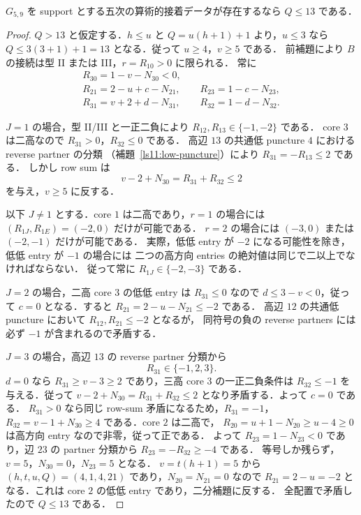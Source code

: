 \begin{proposition}[全ての標準配置における葉分母の上界]
\label{dl19:leaf-bound}
$G_{5,9}$ を support とする五次の算術的接着データが存在するなら $Q\le13$ である．
\end{proposition}
\begin{proof}
$Q>13$ と仮定する．$h\le u$ と $Q=u(h+1)+1$ より，$u\le3$ なら $Q\le3(3+1)+1=13$ となる．従って $u\ge4$，$v\ge5$ である．
前補題により $B$ の接続は型 II または III，$r=R_{10}>0$ に限られる．
常に
\[
 \begin{gathered}
 R_{30}=1-v-N_{30}<0,\\
 R_{21}=2-u+c-N_{21},\qquad R_{23}=1-c-N_{23},\\
 R_{31}=v+2+d-N_{31},\qquad R_{32}=1-d-N_{32}.
 \end{gathered}
\]

$J=1$ の場合，型 II/III と一正二負により $R_{12},R_{13}\in\{-1,-2\}$ である．
core $3$ は二高なので $R_{31}>0$，$R_{32}\le0$ である．
高辺 $13$ の共通低 puncture $4$ における reverse partner の分類
（補題~\ref{ls11:low-puncture}）により $R_{31}=-R_{13}\le2$ である．
しかし row sum は
\[
 v-2+N_{30}=R_{31}+R_{32}\le2
\]
を与え，$v\ge5$ に反する．

以下 $J\ne1$ とする．core $1$ は二高であり，$r=1$ の場合には
$(R_{1J},R_{1E})=(-2,0)$ だけが可能である．
$r=2$ の場合には $(-3,0)$ または $(-2,-1)$ だけが可能である．
実際，低低 entry が $-2$ になる可能性を除き，低低 entry が $-1$ の場合には
二つの高方向 entries の絶対値は同じで二以上でなければならない．
従って常に $R_{1J}\in\{-2,-3\}$ である．

$J=2$ の場合，二高 core $3$ の低低 entry は $R_{31}\le0$ なので
$d\le3-v<0$，従って $c=0$ となる．すると $R_{21}=2-u-N_{21}\le-2$ である．
高辺 $12$ の共通低 puncture において $R_{12},R_{21}\le-2$ となるが，
同符号の負の reverse partners には必ず $-1$ が含まれるので矛盾する．

$J=3$ の場合，高辺 $13$ の reverse partner 分類から
\[
 R_{31}\in\{-1,2,3\}.
\]
$d=0$ なら $R_{31}\ge v-3\ge2$ であり，三高 core $3$ の一正二負条件は
$R_{32}\le-1$ を与える．従って
$v-2+N_{30}=R_{31}+R_{32}\le2$ となり矛盾する．よって $c=0$ である．
$R_{31}>0$ なら同じ row-sum 矛盾になるため，$R_{31}=-1$，
$R_{32}=v-1+N_{30}\ge4$ である．core $2$ は二高で，
$R_{20}=u+1-N_{20}\ge u-4\ge0$ は高方向 entry なので非零，従って正である．
よって $R_{23}=1-N_{23}<0$ であり，辺 $23$ の partner 分類から
$R_{23}=-R_{32}\ge-4$ である．
等号しか残らず，$v=5$，$N_{30}=0$，$N_{23}=5$ となる．
$v=t(h+1)=5$ から $(h,t,u,Q)=(4,1,4,21)$ であり，$N_{20}=N_{21}=0$ なので
$R_{21}=2-u=-2$ となる．これは core $2$ の低低 entry であり，二分補題に反する．
全配置で矛盾したので $Q\le13$ である．
\end{proof}

